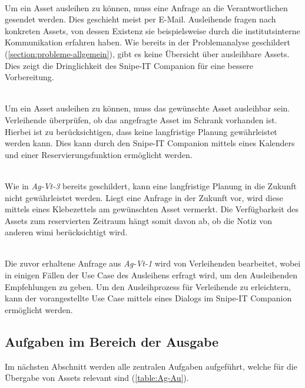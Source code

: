 {\sffamily\color{maincolor}{Ag-Vt-1 | Abfragen der Assets/Verfügbarkeit}}\\
Um ein Asset ausleihen zu können, muss eine Anfrage an die Verantwortlichen gesendet werden. Dies
geschieht meist per E-Mail. Ausleihende fragen nach konkreten Assets, von dessen Existenz sie
beispielsweise durch die institutsinterne Kommunikation erfahren haben. Wie bereits in der
Problemanalyse geschildert (\ref{section:probleme-allgemein}), gibt es keine Übersicht über
ausleihbare Assets. Dies zeigt die Dringlichkeit des Snipe-IT Companion für eine bessere
Vorbereitung.

        {\sffamily\color{maincolor}{Ag-Vt-2 | Einsehen der Verfügbarkeit}}\\
Um ein Asset ausleihen zu können, muss das gewünschte Asset ausleihbar sein.
Verleihende überprüfen, ob das angefragte Asset im Schrank vorhanden ist.
Hierbei ist zu berücksichtigen, dass keine langfristige Planung gewährleistet
werden kann. Dies kann durch den Snipe-IT Companion mittels eines Kalenders und
einer Reservierungsfunktion ermöglicht werden.

        {\sffamily\color{maincolor}{Ag-Vt-3 | Reservierung der Assets}}\\
Wie in \textit{Ag-Vt-3} bereits geschildert, kann eine langfristige Planung in
die Zukunft nicht gewährleistet werden. Liegt eine Anfrage in der Zukunft vor,
wird diese mittels eines Klebezettels am gewünschten Asset vermerkt. Die
Verfügbarkeit des Assets zum reservierten Zeitraum hängt somit davon ab, ob die
Notiz von anderen \ac{wimi} berücksichtigt wird.

        {\sffamily\color{maincolor}{Ag-Vt-4 | Beratung der Ausleihenden}}\\
Die zuvor erhaltene Anfrage aus \textit{Ag-Vt-1} wird von Verleihenden
bearbeitet, wobei in einigen Fällen der Use Case des Ausleihens erfragt wird, um
den Ausleihenden Empfehlungen zu geben. Um den Ausleihprozess für Verleihende zu
erleichtern, kann der vorangestellte Use Case mittels eines Dialogs im Snipe-IT
Companion ermöglicht werden.


\subsection{Aufgaben im Bereich der Ausgabe}
Im nächsten Abschnitt werden alle zentralen Aufgaben aufgeführt, welche für die
Übergabe von Assets relevant sind (\ref{table:Ag-Au}).

